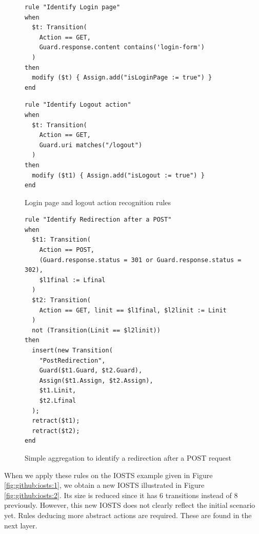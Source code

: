 \begin{figure}[h]
\begin{framed}
\begin{BVerbatim}
rule "Identify Login page"
when
  $t: Transition(
    Action == GET,
    Guard.response.content contains('login-form')
  )
then
  modify ($t) { Assign.add("isLoginPage := true") }
end
\end{BVerbatim}
\end{framed}

\begin{framed}
\begin{BVerbatim}
rule "Identify Logout action"
when
  $t: Transition(
    Action == GET,
    Guard.uri matches("/logout")
  )
then
  modify ($t1) { Assign.add("isLogout := true") }
end
\end{BVerbatim}
\end{framed}

\caption {Login page and logout action recognition rules}
\label{fig:rule:login}
\end{figure}

\begin{figure}[h]
\begin{framed}
\begin{BVerbatim}
rule "Identify Redirection after a POST"
when
  $t1: Transition(
    Action == POST,
    (Guard.response.status = 301 or Guard.response.status = 302),
    $l1final := Lfinal
  )
  $t2: Transition(
    Action == GET, linit == $l1final, $l2linit := Linit
  )
  not (Transition(Linit == $l2linit))
then
  insert(new Transition(
    "PostRedirection",
    Guard($t1.Guard, $t2.Guard),
    Assign($t1.Assign, $t2.Assign),
    $t1.Linit,
    $t2.Lfinal
  );
  retract($t1);
  retract($t2);
end
\end{BVerbatim}
\end{framed}

\caption{Simple aggregation to identify a redirection after a POST request}
\label{fig:rule:redirect}
\end{figure}

\begin{example}
When we apply these rules on the IOSTS example given in Figure
\ref{fig:github:iosts:1}, we obtain a new IOSTS illustrated in
Figure \ref{fig:github:iosts:2}. Its size is reduced since it has
6 transitions instead of 8 previously.  However, this new IOSTS
does not clearly reflect the initial scenario yet. Rules deducing
more abstract actions are required. These are found in the next
layer.
\end{example}

